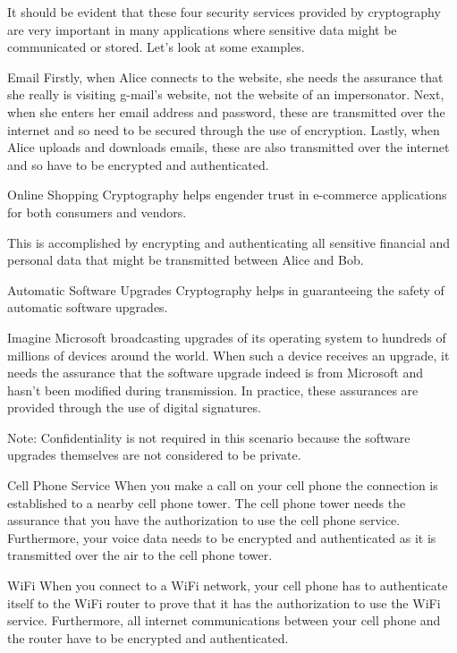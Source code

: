 It should be evident that these four security services provided by
cryptography are very important in many applications where
sensitive data might be communicated or stored. Let's look
at some examples.

\begin{Example}{Email}{}
    Firstly, when Alice connects to the website, she needs the assurance that
    she really is visiting g-mail's website, not the website of an impersonator.
    Next, when she enters her email address and password, these are transmitted
    over the internet and so need to be secured through the use of encryption.
    Lastly, when Alice uploads and downloads emails, these are also transmitted
    over the internet and so have to be encrypted and authenticated.
\end{Example}
\begin{Example}{Online Shopping}{}
    Cryptography helps engender trust in e-commerce applications for both
    consumers and vendors.

    This is accomplished by encrypting and authenticating all sensitive financial
    and personal data that might be transmitted between Alice and Bob.
\end{Example}
\begin{Example}{Automatic Software Upgrades}{}
    Cryptography helps in guaranteeing the safety of automatic software upgrades.

    Imagine Microsoft broadcasting upgrades of its operating system to hundreds of millions
    of devices around the world.
    When such a device receives an upgrade, it needs the assurance that the
    software upgrade indeed is from Microsoft and hasn't been modified during
    transmission. In practice, these assurances are provided through the use
    of digital signatures.

    Note: Confidentiality is not required in this scenario because the software
    upgrades themselves are not considered to be private.
\end{Example}
\begin{Example}{Cell Phone Service}{}
    When you make a call on your cell phone the connection is established to a
    nearby cell phone tower. The cell phone tower needs the assurance that
    you have the authorization to use the cell phone service.
    Furthermore, your voice data needs to be encrypted and authenticated as it
    is transmitted over the air to the cell phone tower.
\end{Example}
\begin{Example}{WiFi}{}
    When you connect to a WiFi network, your cell phone has to authenticate itself to
    the WiFi router to prove that it has the authorization to use the WiFi
    service. Furthermore, all internet communications between
    your cell phone and the router have to be encrypted and authenticated.
\end{Example}
